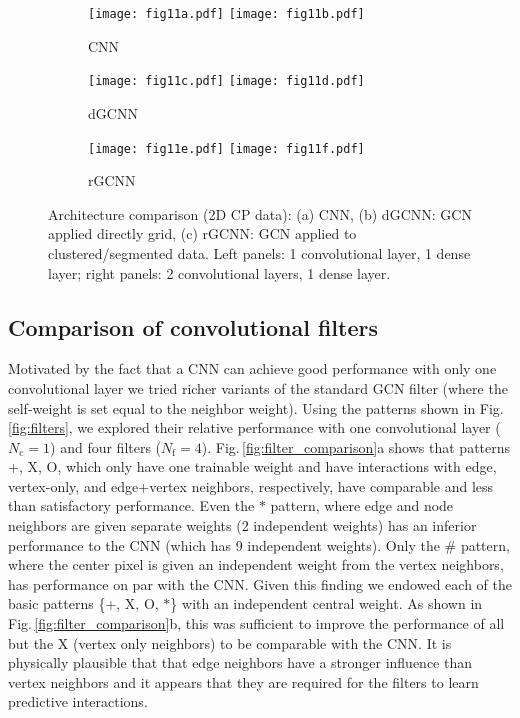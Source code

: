 \documentclass[12pt,reqno]{article}
\newcommand{\fref}[1]{Fig.\,\ref{#1}}
\newcommand{\DGCNN}{{dGCNN}}
\newcommand{\RGCNN}{{rGCNN}}
\newcommand{\Nf}{N_\text{f}}
\newcommand{\Nc}{N_\text{c}}
\begin{document}
\begin{figure}
\centering
\begin{subfigure}[c]{0.9\textwidth}
{\texttt{[image: fig11a.pdf]}}
{\texttt{[image: fig11b.pdf]}}
\caption{CNN}
\end{subfigure}
\begin{subfigure}[c]{0.9\textwidth}
{\texttt{[image: fig11c.pdf]}}
{\texttt{[image: fig11d.pdf]}}
\caption{\DGCNN}
\end{subfigure}
\begin{subfigure}[c]{0.9\textwidth}
{\texttt{[image: fig11e.pdf]}}
{\texttt{[image: fig11f.pdf]}}
\caption{\RGCNN}
\end{subfigure}
\caption{Architecture comparison (2D CP data): (a) CNN, (b) \DGCNN: GCN applied directly grid, (c) \RGCNN: GCN applied to clustered/segmented data.
Left panels: 1 convolutional layer, 1 dense layer;
right panels: 2 convolutional layers, 1 dense layer.
}
\label{fig:architecture_comparison}
\end{figure}

\subsection{Comparison of convolutional filters} \label{sec:filter}

Motivated by the fact that a CNN can achieve good performance with only one convolutional layer we tried richer variants of the standard GCN filter (where the self-weight is set equal to the neighbor weight).
Using the patterns shown in \fref{fig:filters}, we explored their relative performance with one convolutional layer ($\Nc=1$) and four filters ($\Nf=4$).
\fref{fig:filter_comparison}a shows that patterns +, X, O, which only have one trainable weight and have interactions with edge, vertex-only, and edge+vertex neighbors, respectively, have comparable and less than satisfactory performance.
Even the $\ast$ pattern, where edge and node neighbors are given separate weights (2 independent weights) has an inferior performance to the CNN (which has 9 independent weights).
Only the \# pattern, where the center pixel is given an independent weight from the vertex neighbors, has performance on par with the CNN.
Given this finding we endowed each of the basic patterns \{+, X, O, $\ast$\} with an independent central weight.
As shown in \fref{fig:filter_comparison}b, this was sufficient to improve the performance of all but the X (vertex only neighbors) to be comparable with the CNN.
It is physically plausible that that edge neighbors have a stronger influence than vertex neighbors and it appears that they are required for the filters to learn predictive interactions.
\end{document}
